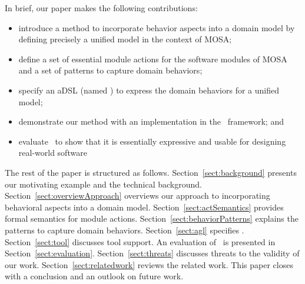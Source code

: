 In brief, our paper makes the following contributions:
%
\begin{itemize}[leftmargin=*]
	\item introduce a method to incorporate behavior aspects into a domain model by defining precisely a unified model in the context of MOSA;
	\item define a set of essential module actions for the software modules of MOSA and a set of patterns to capture domain behaviors;
	\item specify an aDSL (named \agl) to express the domain behaviors for a unified model;
	\item demonstrate our method with an implementation in the \jdomainapp~framework; and
  \item evaluate \agl~to show that it is essentially expressive and usable for designing real-world software
\end{itemize}

The rest of the paper is structured as follows. Section~\ref{sect:background} presents our motivating example and the technical background. 
Section~\ref{sect:overviewApproach} overviews our approach to incorporating behavioral aspects into a domain model. 
Section~\ref{sect:actSemantics} provides formal semantics for module actions. Section~\ref{sect:behaviorPatterns} explains the patterns to capture domain behaviors.  
Section~\ref{sect:agl} specifies \agl. 
Section~\ref{sect:tool} discusses tool support.
An evaluation of \agl~is presented in Section~\ref{sect:evaluation}. Section~\ref{sect:threats} discusses threats to the validity of our work.
Section~\ref{sect:relatedwork} reviews the related work. This paper closes with a conclusion and an outlook on future work.
